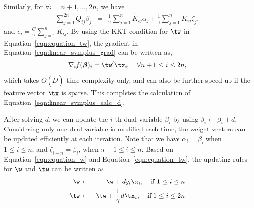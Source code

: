 Similarly,  for  $\forall i = n+1, \ldots, 2n$, we have
\begin{eqnarray}
\sum_{j=1}^{2n}Q_{ij}\beta_j &=& \frac{1}{\gamma}\sum_{j=1}^n\tilde{K}_{ij}\alpha_j + \frac{1}{\gamma}\sum_{j=1}^n\tilde{K}_{ij}\zeta_j,\nonumber
\end{eqnarray}
and $e_i = \frac{C}{\gamma}\sum_{j=1}^n\tilde{K}_{ij}$. By using the KKT condition for $\tw$ in Equation~\ref{eqn:equation_tw}, the gradient in Equation~\ref{eqn:linear_svmplus_grad} can be written as,
\begin{eqnarray}\label{eqn:linear_svmplus_grad_02}
\nabla_if(\bb)_i = \tw'\tx_i,\quad \forall n+1\leq i \leq 2n,
\end{eqnarray}
which takes $O(\tilde{D})$ time complexity only, and can also be further speed-up if the feature vector $\tx$ is sparse. This completes the calculation of Equation~\ref{eqn:linear_svmplus_calc_d}.

After solving $d$, we can update the $i$-th dual variable $\beta_i$ by using $\beta_i\leftarrow \beta_i + d$. Considering only one dual variable is modified each time, the weight vectors can be updated efficiently at each iteration. Note that we have $\alpha_i = \beta_i$ when $1\leq i\leq n$, and $\zeta_{i-n} = \beta_{i}$, when $n+1\leq i \leq n$. Based on Equation~\ref{eqn:equation_w} and Equation~\ref{eqn:equation_tw}, the updating rules for $\w$ and $\tw$ can be written as
\begin{eqnarray}
\w  &\leftarrow& \w + dy_i\x_i, \quad \mbox{if\,\,} 1\leq i \leq n\label{enq:update_w}\\
\tw  &\leftarrow& \tw + \frac{1}{\gamma}d\tx_i,\quad \mbox{if\,\,} 1\leq i \leq 2n\label{enq:update_tw}
\end{eqnarray}

